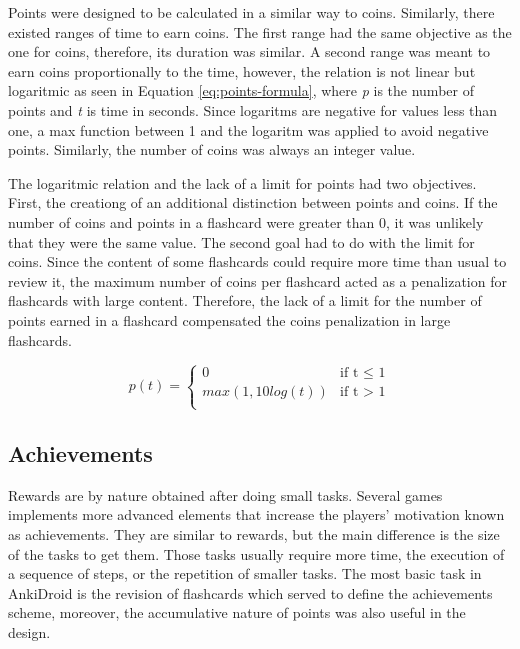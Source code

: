 Points were designed to be calculated in a similar way to coins. Similarly, there existed ranges of time to earn coins. The first range had the same objective as the one for coins, therefore, its duration was similar. A second range was meant to earn coins proportionally to the time, however, the relation is not linear but logaritmic as seen in Equation \ref{eq:points-formula}, where \textit{p} is the number of points and \textit{t} is time in seconds. Since logaritms are negative for values less than one, a max function between 1 and the logaritm was applied to avoid negative points. Similarly, the number of coins was always an integer value.

The logaritmic relation and the lack of a limit for points had two objectives. First, the creationg of an additional distinction between points and coins. If the number of coins and points in a flashcard were greater than 0, it was unlikely that they were the same value. The second goal had to do with the limit for coins. Since the content of some flashcards could require more time than usual to review it, the maximum number of coins per flashcard acted as a penalization for flashcards with large content. Therefore, the lack of a limit for the number of points earned in a flashcard compensated the coins penalization in large flashcards.

\begin{equation}
  p(t) =
      \begin{cases}
        0 & \text{if t $\leq$ 1}\\
        max(1, 10log(t)) & \text{if t $>$ 1}\\
      \end{cases}
    \label{eq:points-formula}
\end{equation}

\subsection{Achievements}
Rewards are by nature obtained after doing small tasks. Several games implements more advanced elements that increase the players' motivation known as achievements. They are similar to rewards, but the main difference is the size of the tasks to get them. Those tasks usually require more time, the execution of a sequence of steps, or the repetition of smaller tasks. The most basic task in AnkiDroid is the revision of flashcards which served to define the achievements scheme, moreover, the accumulative nature of points was also useful in the design.

